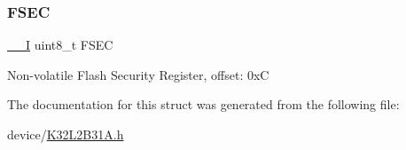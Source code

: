 \subsubsection{\texorpdfstring{FSEC}{FSEC}}
{\footnotesize\ttfamily \mbox{\hyperlink{core__cm0plus_8h_af63697ed9952cc71e1225efe205f6cd3}{\+\_\+\+\_\+I}} uint8\+\_\+t F\+S\+EC}

Non-\/volatile Flash Security Register, offset\+: 0xC 

The documentation for this struct was generated from the following file\+:\begin{DoxyCompactItemize}
\item 
device/\mbox{\hyperlink{_k32_l2_b31_a_8h}{K32\+L2\+B31\+A.\+h}}\end{DoxyCompactItemize}
